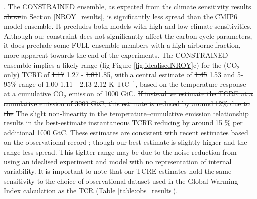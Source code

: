 \documentclass[gmd, manuscript]{copernicus}
\providecommand{\DIFadd}[1]{{\protect\color{blue}#1}} %
\providecommand{\DIFdel}[1]{{\protect\color{red}\sout{#1}}}                      %
\providecommand{\DIFaddbegin}{} %
\providecommand{\DIFaddend}{} %
\providecommand{\DIFdelbegin}{} %
\providecommand{\DIFdelend}{} %
\begin{document}
{}\DIFaddend . The CONSTRAINED ensemble, as expected from the climate sensitivity results \DIFdelbegin \DIFdel{above}\DIFdelend \DIFaddbegin \DIFadd{in Section \ref{NROY_results}}\DIFaddend , is significantly less spread than the CMIP6 model ensemble. It precludes both models with high and low climate sensitivities. Although our constraint does not significantly affect the carbon-cycle parameters, it does preclude some FULL ensemble members with a high airborne fraction, more apparent towards the end of the experiments. The CONSTRAINED ensemble implies a likely range (\DIFdelbegin \DIFdel{fig }\DIFdelend \DIFaddbegin \DIFadd{Figure }\DIFaddend \ref{fig:idealisedNROY}c) for the (CO$_2$-only) TCRE \citep{Matthews2009a,Allen2009,Zickfeld2016,MacDougall2016} of \DIFdelbegin \DIFdel{1.17 }\DIFdelend \DIFaddbegin \DIFadd{1.27 }\DIFaddend - \DIFdelbegin \DIFdel{1.81}\DIFdelend \DIFaddbegin \DIFadd{1.85}\DIFaddend , with a central estimate of \DIFdelbegin \DIFdel{1.45 }\DIFdelend \DIFaddbegin \DIFadd{1.53 }\DIFaddend and 5-95\% range of \DIFdelbegin \DIFdel{1.00 }\DIFdelend \DIFaddbegin \DIFadd{1.11 }\DIFaddend - \DIFdelbegin \DIFdel{2.13 }\DIFdelend \DIFaddbegin \DIFadd{2.12 }\DIFaddend K TtC$^{-1}$, based on the temperature response at a cumulative CO$_2$ emission of 1000 GtC. \DIFdelbegin \DIFdel{If instead we estimate the TCRE at a cumulative emission of 3000 GtC, this estimate is reduced by around 12\% due to the }\DIFdelend \DIFaddbegin \DIFadd{The }\DIFaddend slight non-linearity in the temperature--cumulative emission relationship \DIFaddbegin \DIFadd{results in the best-estimate instantaneous TCRE reducing by around 15 \% per additional 1000 GtC}\DIFaddend . These estimates are consistent with recent estimates based on the observational record \citep{Millar20160449,Gillett2013}; though our best-estimate is slightly higher and the range less spread. This tighter range may be due to the noise reduction from using an idealised experiment and model with no representation of internal variability. \DIFaddbegin \DIFadd{It is important to note that our TCRE estimates hold the same sensitivity to the choice of observational dataset used in the Global Warming Index calculation as the TCR (Table \ref{table:obs_results}). 
}\DIFaddend %
\DIFdelbegin %
\DIFdelend \DIFaddbegin \clearpage
\end{document}
